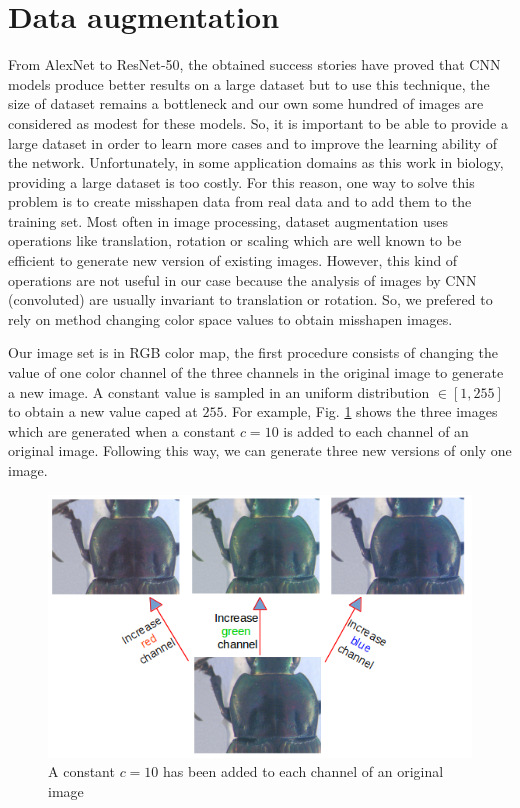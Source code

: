 \documentclass[review]{elsarticle}
\begin{document}
\section{Data augmentation}
\label{Sdataaug}
From AlexNet to ResNet-50, the obtained success stories
\cite{krizhevsky2012imagenet,he2016deep} have proved that CNN models
produce better results on a large dataset but to use this technique,
the size of dataset remains a bottleneck and our own some hundred of
images are considered as modest for these models. So, it is important
to be able to provide a large dataset in order to learn more cases and to improve the learning ability of the network. Unfortunately, in some
application domains as this work in biology, providing a large dataset
is too costly. For this reason, one way to solve this problem is to
create misshapen data from real data and to add them to the training
set. Most often in image processing, dataset augmentation uses
operations like translation, rotation or scaling which are well known
to be efficient to generate new version of existing images. However,
this kind of operations are not useful in our case because the
analysis of images by CNN (convoluted) are usually invariant to
translation or rotation. So, we prefered to rely on method changing
color space values to obtain misshapen images.

Our image set is in RGB color map, the first procedure consists of
changing the value of one color channel of the three channels in the
original image to generate a new image. A constant value is sampled in
an uniform distribution $\in [1, 255]$ to obtain a new value caped at
$255$. For example, Fig. \ref{figaug1} shows the three images which
are generated  when a constant $c = 10$ is added to each channel of an
original image. Following this way, we can generate three new versions
of only one image.

\begin{figure}[h]
	\centering
	\includegraphics[scale=0.4]{images/inc_channels}
	\caption{A constant $c = 10$ has been added to each channel of an original image}
	\label{figaug1}
\end{figure}
\end{document}
